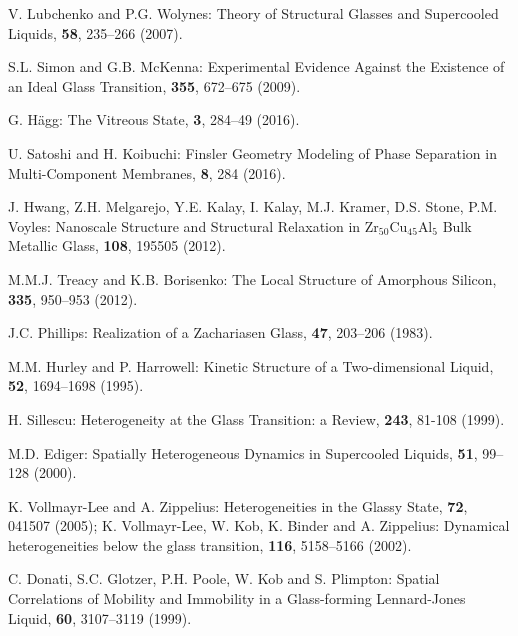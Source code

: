 \documentclass[10pt]{article}
\begin{document}
\begin{thebibliography}{99}
 V. Lubchenko and P.G. Wolynes:
\newblock Theory of Structural Glasses and Supercooled Liquids,
 {\bf 58}, 235--266 (2007).

 S.L. Simon and G.B. McKenna:
\newblock Experimental Evidence Against the Existence of an Ideal Glass
Transition,
 {\bf 355}, 672--675 (2009).


 G. H\"agg:
\newblock The Vitreous State,
 {\bf 3}, 284--49 (2016).

 U. Satoshi and H. Koibuchi:
\newblock Finsler Geometry Modeling of Phase Separation in Multi-Component 
Membranes,
 {\bf 8}, 284 (2016).


 J. Hwang, Z.H. Melgarejo, Y.E. Kalay, I. Kalay, M.J. Kramer, 
D.S. Stone, P.M. Voyles:
\newblock Nanoscale Structure and Structural Relaxation in Zr$_50$Cu$_45$Al$_5$
Bulk Metallic Glass,
 {\bf 108}, 195505 (2012).

 M.M.J. Treacy and K.B. Borisenko:
\newblock The Local Structure of Amorphous Silicon,
 {\bf 335}, 950--953 (2012).

 J.C. Phillips:
\newblock Realization of a Zachariasen Glass,
 {\bf 47}, 203--206 (1983).


 M.M. Hurley and P. Harrowell:
\newblock Kinetic Structure of a Two-dimensional Liquid,
 {\bf 52}, 1694--1698 (1995).

 H. Sillescu:
\newblock Heterogeneity at the Glass Transition: a Review,
 {\bf 243}, 81-108 (1999).

 M.D. Ediger:
\newblock Spatially Heterogeneous Dynamics in Supercooled Liquids,
 {\bf 51}, 99--128 (2000).

 K. Vollmayr-Lee and A. Zippelius:
\newblock Heterogeneities in the Glassy State,
 {\bf 72}, 041507 (2005);
\newblock K. Vollmayr-Lee, W. Kob, K. Binder and A. Zippelius:
\newblock Dynamical heterogeneities below the glass transition,
 {\bf 116}, 5158--5166 (2002).

 C. Donati, S.C. Glotzer, P.H. Poole, W. Kob and 
S. Plimpton:
\newblock Spatial Correlations of Mobility and Immobility in a Glass-forming 
Lennard-Jones Liquid,
 {\bf 60}, 3107--3119 (1999). 


\end{thebibliography}
\end{document}
